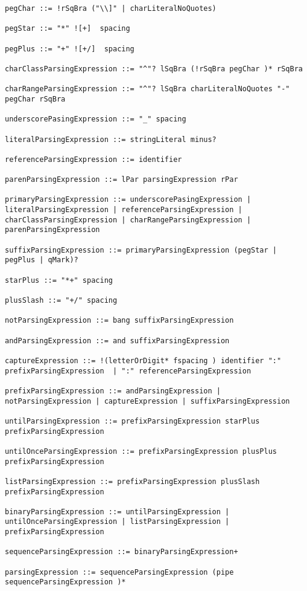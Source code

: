\begin{lstlisting}[breaklines=true]
pegChar ::= !rSqBra ("\\]" | charLiteralNoQuotes)

pegStar ::= "*" ![+]  spacing

pegPlus ::= "+" ![+/]  spacing

charClassParsingExpression ::= "^"? lSqBra (!rSqBra pegChar )* rSqBra

charRangeParsingExpression ::= "^"? lSqBra charLiteralNoQuotes "-" pegChar rSqBra

underscorePasingExpression ::= "_" spacing

literalParsingExpression ::= stringLiteral minus?

referenceParsingExpression ::= identifier

parenParsingExpression ::= lPar parsingExpression rPar

primaryParsingExpression ::= underscorePasingExpression | literalParsingExpression | referenceParsingExpression | charClassParsingExpression | charRangeParsingExpression | parenParsingExpression

suffixParsingExpression ::= primaryParsingExpression (pegStar | pegPlus | qMark)?

starPlus ::= "*+" spacing

plusSlash ::= "+/" spacing

notParsingExpression ::= bang suffixParsingExpression

andParsingExpression ::= and suffixParsingExpression

captureExpression ::= !(letterOrDigit* fspacing ) identifier ":" prefixParsingExpression  | ":" referenceParsingExpression

prefixParsingExpression ::= andParsingExpression | notParsingExpression | captureExpression | suffixParsingExpression

untilParsingExpression ::= prefixParsingExpression starPlus prefixParsingExpression

untilOnceParsingExpression ::= prefixParsingExpression plusPlus prefixParsingExpression

listParsingExpression ::= prefixParsingExpression plusSlash prefixParsingExpression

binaryParsingExpression ::= untilParsingExpression | untilOnceParsingExpression | listParsingExpression | prefixParsingExpression

sequenceParsingExpression ::= binaryParsingExpression+

parsingExpression ::= sequenceParsingExpression (pipe sequenceParsingExpression )*


\end{lstlisting}

